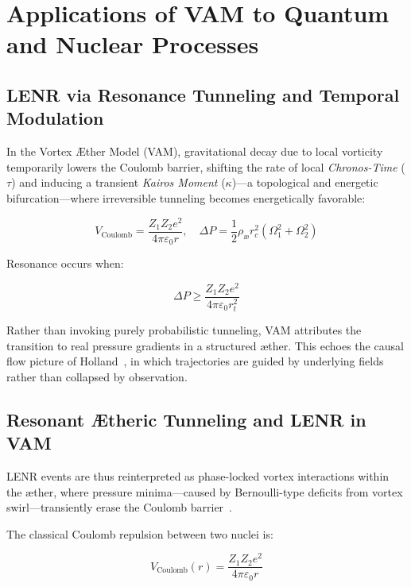 \documentclass[preprint]{revtex4-2}
\begin{document}
\section{Applications of VAM to Quantum and Nuclear Processes}
\label{sec:LENR_QED}

\subsection*{LENR via Resonance Tunneling and Temporal Modulation}

In the Vortex Æther Model (VAM), gravitational decay due to local vorticity temporarily lowers the Coulomb barrier, shifting the rate of local \emph{Chronos-Time} (\(\tau\)) and inducing a transient \emph{Kairos Moment} (\(\kappa\))—a topological and energetic bifurcation—where irreversible tunneling becomes energetically favorable:

\begin{equation}
    V_\text{Coulomb} = \frac{Z_1 Z_2 e^2}{4\pi \varepsilon_0 r}, \quad
    \Delta P = \frac{1}{2} \rho_\text{\ae} r_c^2 (\Omega_1^2 + \Omega_2^2)
\end{equation}

Resonance occurs when:

\begin{equation}
    \Delta P \geq \frac{Z_1 Z_2 e^2}{4\pi \varepsilon_0 r_t^2}
\end{equation}

Rather than invoking purely probabilistic tunneling, VAM attributes the transition to real pressure gradients in a structured æther. This echoes the causal flow picture of Holland~\cite{holland1993quantum}, in which trajectories are guided by underlying fields rather than collapsed by observation.

\subsection*{Resonant Ætheric Tunneling and LENR in VAM}

LENR events are thus reinterpreted as phase-locked vortex interactions within the æther, where pressure minima—caused by Bernoulli-type deficits from vortex swirl—transiently erase the Coulomb barrier~\cite{Barcelo2011, volovik2003}.

The classical Coulomb repulsion between two nuclei is:

\begin{equation}
    V_\text{Coulomb}(r) = \frac{Z_1 Z_2 e^2}{4\pi \varepsilon_0 r}
\end{equation}
\end{document}
